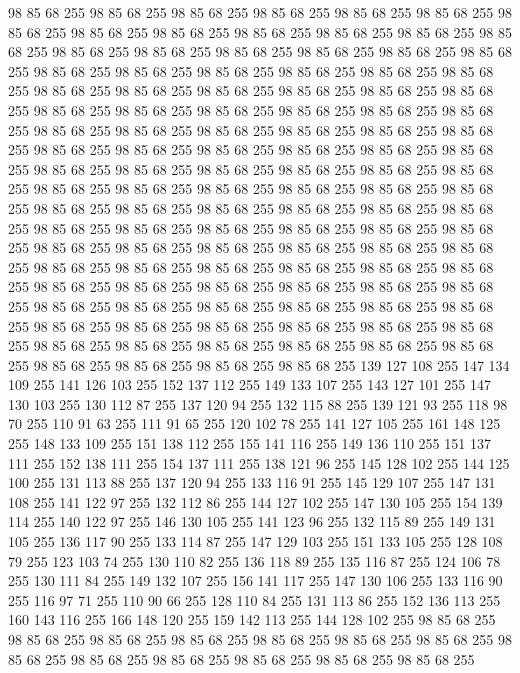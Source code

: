 98 85 68 255 98 85 68 255 98 85 68 255 98 85 68 255 98 85 68 255 98 85 68 255 98 85 68 255 98 85 68 255 98 85 68 255 98 85 68 255 98 85 68 255 98 85 68 255 98 85 68 255 98 85 68 255 98 85 68 255 98 85 68 255 98 85 68 255 98 85 68 255 98 85 68 255 98 85 68 255 98 85 68 255 98 85 68 255 98 85 68 255 98 85 68 255 98 85 68 255 98 85 68 255 98 85 68 255 98 85 68 255 98 85 68 255 98 85 68 255 98 85 68 255 98 85 68 255 98 85 68 255 98 85 68 255 98 85 68 255 98 85 68 255 98 85 68 255 98 85 68 255 98 85 68 255 98 85 68 255 98 85 68 255 98 85 68 255 98 85 68 255 98 85 68 255 98 85 68 255 98 85 68 255 98 85 68 255 98 85 68 255 98 85 68 255 98 85 68 255 98 85 68 255 98 85 68 255 98 85 68 255 98 85 68 255 98 85 68 255 98 85 68 255 98 85 68 255 98 85 68 255 98 85 68 255 98 85 68 255 98 85 68 255 98 85 68 255 98 85 68 255 98 85 68 255
98 85 68 255 98 85 68 255 98 85 68 255 98 85 68 255 98 85 68 255 98 85 68 255 98 85 68 255 98 85 68 255 98 85 68 255 98 85 68 255 98 85 68 255 98 85 68 255 98 85 68 255 98 85 68 255 98 85 68 255 98 85 68 255 98 85 68 255 98 85 68 255 98 85 68 255 98 85 68 255 98 85 68 255 98 85 68 255 98 85 68 255 98 85 68 255 98 85 68 255 98 85 68 255 98 85 68 255 98 85 68 255 98 85 68 255 98 85 68 255 98 85 68 255 98 85 68 255 98 85 68 255 98 85 68 255 98 85 68 255 98 85 68 255 98 85 68 255 98 85 68 255 98 85 68 255 98 85 68 255 98 85 68 255 98 85 68 255 98 85 68 255 98 85 68 255 98 85 68 255 98 85 68 255 98 85 68 255 98 85 68 255 98 85 68 255 139 127 108 255 147 134 109 255 141 126 103 255 152 137 112 255 149 133 107 255 143 127 101 255 147 130 103 255 130 112 87 255 137 120 94 255 132 115 88 255 139 121 93 255 118 98 70 255 110 91 63 255 111 91 65 255 120 102 78 255
141 127 105 255 161 148 125 255 148 133 109 255 151 138 112 255 155 141 116 255 149 136 110 255 151 137 111 255 152 138 111 255 154 137 111 255 138 121 96 255 145 128 102 255 144 125 100 255 131 113 88 255 137 120 94 255 133 116 91 255 145 129 107 255 147 131 108 255 141 122 97 255 132 112 86 255 144 127 102 255 147 130 105 255 154 139 114 255 140 122 97 255 146 130 105 255 141 123 96 255 132 115 89 255 149 131 105 255 136 117 90 255 133 114 87 255 147 129 103 255 151 133 105 255 128 108 79 255 123 103 74 255 130 110 82 255 136 118 89 255 135 116 87 255 124 106 78 255 130 111 84 255 149 132 107 255 156 141 117 255 147 130 106 255 133 116 90 255 116 97 71 255 110 90 66 255 128 110 84 255 131 113 86 255 152 136 113 255 160 143 116 255 166 148 120 255 159 142 113 255 144 128 102 255 98 85 68 255 98 85 68 255 98 85 68 255 98 85 68 255 98 85 68 255 98 85 68 255 98 85 68 255 98 85 68 255 98 85 68 255 98 85 68 255 98 85 68 255 98 85 68 255 98 85 68 255
